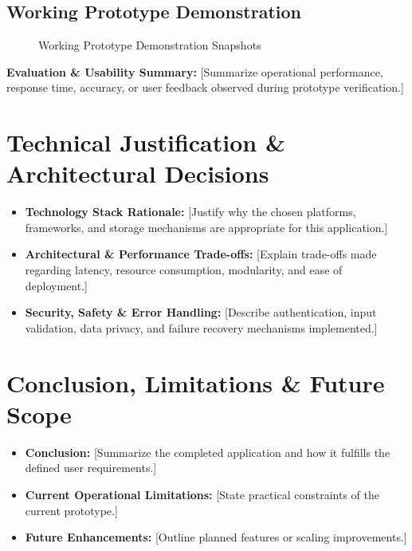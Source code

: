 \documentclass[11pt, a4paper]{article}
\begin{document}
\subsection{Working Prototype Demonstration}
\begin{figure}[H]
    \centering
    \caption{Working Prototype Demonstration Snapshots}
\end{figure}

\noindent
\textbf{Evaluation \& Usability Summary:} {[Summarize operational performance, response time, accuracy, or user feedback observed during prototype verification.]}

\section{Technical Justification \& Architectural Decisions}
\begin{itemize}[noitemsep, topsep=2pt]
    \item \textbf{Technology Stack Rationale:} {[Justify why the chosen platforms, frameworks, and storage mechanisms are appropriate for this application.]}
    \item \textbf{Architectural \& Performance Trade-offs:} {[Explain trade-offs made regarding latency, resource consumption, modularity, and ease of deployment.]}
    \item \textbf{Security, Safety \& Error Handling:} {[Describe authentication, input validation, data privacy, and failure recovery mechanisms implemented.]}
\end{itemize}

\section{Conclusion, Limitations \& Future Scope}
\begin{itemize}[noitemsep, topsep=2pt]
    \item \textbf{Conclusion:} {[Summarize the completed application and how it fulfills the defined user requirements.]}
    \item \textbf{Current Operational Limitations:} {[State practical constraints of the current prototype.]}
    \item \textbf{Future Enhancements:} {[Outline planned features or scaling improvements.]}
\end{itemize}
\end{document}
